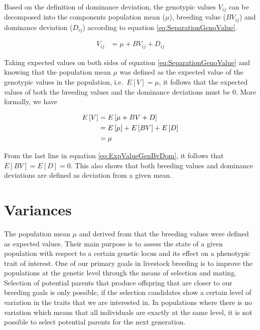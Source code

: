 \documentclass[
]{book}
\theoremstyle{definition}
\theoremstyle{definition}
\theoremstyle{definition}
\theoremstyle{remark}
\begin{document}
Based on the definition of dominance deviation, the genotypic values \(V_{ij}\) can be decomposed into the components population mean (\(\mu\)), breeding value (\(BV_{ij}\)) and dominance deviation (\(D_{ij}\)) according to equation \eqref{eq:SeparationGenoValue}.

\begin{align}
V_{ij} &=   \mu + BV_{ij} + D_{ij}
\label{eq:SeparationGenoValue}
\end{align}

Taking expected values on both sides of equation \eqref{eq:SeparationGenoValue} and knowing that the population mean \(\mu\) was defined as the expected value of the genotypic values in the population, i.e.~\(E\left[ V \right] = \mu\), it follows that the expected values of both the breeding values and the dominance deviations must be \(0\). More formally, we have

\begin{align}
E\left[ V \right] &=  E\left[ \mu + BV + D \right] \notag \\
                  &=  E\left[ \mu \right]  + E\left[ BV \right] + E\left[ D \right] \notag \\
                  &=  \mu
\label{eq:ExpValueGenBvDom}
\end{align}

From the last line in equation \eqref{eq:ExpValueGenBvDom}, it follows that \(E\left[ BV \right] = E\left[ D \right] = 0\). This also shows that both breeding values and dominance deviations are defined as deviation from a given mean.

\hypertarget{variances}{%
\section{Variances}\label{variances}}

The population mean \(\mu\) and derived from that the breeding values were defined as expected values. Their main purpose is to assess the state of a given population with respect to a certain genetic locus and its effect on a phenotypic trait of interest. One of our primary goals in livestock breeding is to improve the populations at the genetic level through the means of selection and mating. Selection of potential parents that produce offspring that are closer to our breeding goals is only possible, if the selection candidates show a certain level of variation in the traits that we are interested in. In populations where there is no variation which means that all individuals are exactly at the same level, it is not possible to select potential parents for the next generation.
\end{document}
